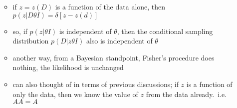 \documentclass[../jaynes_prob_theory_notes.tex]{subfiles}
\begin{document}
\begin{itemize}
\begin{itemize}
\begin{equation*}
                            \end{equation*}
                        \item if $z = z(D)$ is a function of the data alone, then $p(z|D{\theta}I) = \delta [z - z(d)]$
                        \item so, if $p(z|{\theta}I)$ is independent of $\theta$, then the conditional sampling distribution $p(D|z{\theta}I)$ also is independent of $\theta$
                        \item another way, from a Bayesian standpoint, Fisher's procedure does nothing, the likelihood is unchanged
                        \item can also thought of in terms of previous discussions; if $z$ is a function of only the data, then we know the value of $z$ from the data already.\ i.e.\ $AA = A$
                    \end{itemize}
            \end{itemize}
\end{document}
